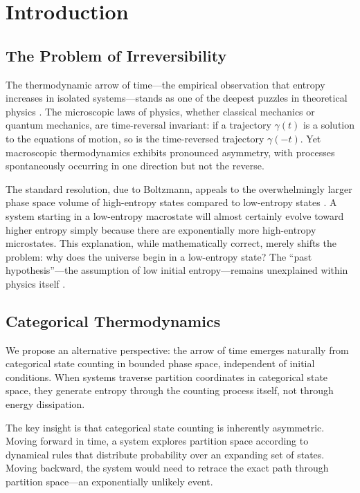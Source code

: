 \section{Introduction}

\subsection{The Problem of Irreversibility}

The thermodynamic arrow of time---the empirical observation that entropy increases in isolated systems---stands as one of the deepest puzzles in theoretical physics \cite{boltzmann1877,penrose1989,price1996,lebowitz1993}. The microscopic laws of physics, whether classical mechanics or quantum mechanics, are time-reversal invariant: if a trajectory $\gamma(t)$ is a solution to the equations of motion, so is the time-reversed trajectory $\gamma(-t)$. Yet macroscopic thermodynamics exhibits pronounced asymmetry, with processes spontaneously occurring in one direction but not the reverse.

The standard resolution, due to Boltzmann, appeals to the overwhelmingly larger phase space volume of high-entropy states compared to low-entropy states \cite{boltzmann1896}. A system starting in a low-entropy macrostate will almost certainly evolve toward higher entropy simply because there are exponentially more high-entropy microstates. This explanation, while mathematically correct, merely shifts the problem: why does the universe begin in a low-entropy state? The ``past hypothesis''---the assumption of low initial entropy---remains unexplained within physics itself \cite{albert2000,carroll2010}.

\subsection{Categorical Thermodynamics}

We propose an alternative perspective: the arrow of time emerges naturally from categorical state counting in bounded phase space, independent of initial conditions. When systems traverse partition coordinates in categorical state space, they generate entropy through the counting process itself, not through energy dissipation.

The key insight is that categorical state counting is inherently asymmetric. Moving forward in time, a system explores partition space according to dynamical rules that distribute probability over an expanding set of states. Moving backward, the system would need to retrace the exact path through partition space---an exponentially unlikely event.

